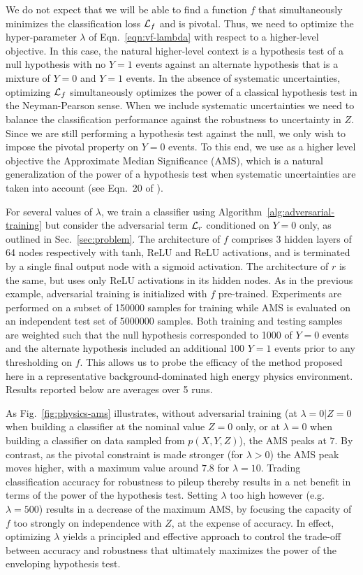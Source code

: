 \documentclass{article}
\theoremstyle{plain}
\begin{document}
We do not expect that we will be able to find a function $f$ that simultaneously
minimizes the classification loss ${\cal L}_f$ and is pivotal. Thus, we need to optimize
the hyper-parameter $\lambda$ of Eqn.~\ref{eqn:vf-lambda} with respect to
a higher-level objective. In this case, the natural higher-level context is a
hypothesis test of a null hypothesis with no $Y=1$ events against an
alternate hypothesis that is a mixture of $Y=0$ and $Y=1$ events.
In the absence of systematic uncertainties, optimizing ${\cal L}_f$ simultaneously
optimizes the power of a classical hypothesis test in the Neyman-Pearson sense.
When we include systematic uncertainties we need to balance the
classification performance against the robustness to uncertainty in $Z$.
Since we are still performing a hypothesis test against the null, we only
wish to impose the pivotal property on $Y=0$ events. To this end,
we use as a higher level objective the Approximate Median Significance (AMS), which is a natural generalization
of the power of a hypothesis test when systematic uncertainties are taken into account
(see Eqn.~20 of \cite{adam2014higgs}).

For several values of $\lambda$, we train a classifier
using  Algorithm~\ref{alg:adversarial-training} but consider the adversarial
term ${\cal L}_r$ conditioned on $Y=0$ only, as outlined in
Sec.~\ref{sec:problem}. The architecture of $f$ comprises 3 hidden layers of 64 nodes
respectively with tanh, ReLU and ReLU activations, and is terminated by a single final
output node with a sigmoid activation. The architecture of $r$ is the same,
but uses only ReLU activations in its hidden nodes.
As in the previous example, adversarial training is initialized
with $f$ pre-trained. Experiments are performed on a subset of
150000 samples for training while AMS is evaluated on an independent test set of
5000000 samples. Both training and testing samples are weighted such that the
null hypothesis corresponded to 1000  of $Y=0$ events and the alternate
hypothesis included an additional 100 $Y=1$ events prior to any thresholding on $f$.
This allows us to probe the efficacy of the
method proposed here in a representative background-dominated high energy physics environment.
Results reported below are averages over 5 runs.



As  Fig.~\ref{fig:physics-ams} illustrates, without adversarial training (at
$\lambda=0|Z=0$ when building a classifier at the nominal value $Z=0$ only, or
at $\lambda=0$ when building a classifier on data sampled from $p(X,Y,Z)$), the
AMS peaks at $7$. By contrast, as the pivotal constraint
is made stronger (for $\lambda > 0$) the AMS peak moves higher, with a maximum
value around  $7.8$ for $\lambda=10$. Trading classification
accuracy for robustness to pileup thereby results in a net
benefit in terms of the power of the hypothesis test. Setting $\lambda$ too high however
(e.g. $\lambda=500$) results in a decrease of the maximum AMS, by
focusing the capacity of $f$ too strongly on independence with $Z$, at the expense of
accuracy. In effect, optimizing $\lambda$
yields a principled and effective approach to control the trade-off between
accuracy and robustness that ultimately maximizes the
power of the enveloping hypothesis test.
\end{document}
